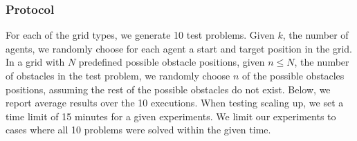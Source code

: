 \documentclass[letterpaper]{article} %
\begin{document}
\subsubsection{Protocol}

For each of the grid types, we generate 10 test problems. Given $k$, the number of agents, we randomly choose for each agent a start and target position in the grid. In a grid with $N$ predefined possible obstacle positions, given $n\leq N$, the number of obstacles in the test problem, we randomly choose $n$ of the possible obstacles positions, assuming the rest of the possible obstacles do not exist. 
Below, we report average results over the 10 executions.
When testing scaling up, we set a time limit of 15 minutes for a given experiments. We limit our experiments to cases where all 10 problems were solved within the given time.

\end{document}
